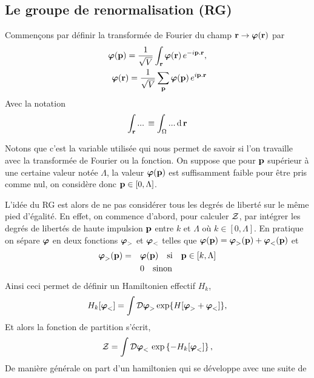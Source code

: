 \documentclass[10pt]{article}
\begin{document}
\begin{multicols}{2}
\vspace*{11pt}
\subsection{Le groupe de renormalisation (RG)}
Commençons par définir la transformée de Fourier du champ ${\bf r} \rightarrow \boldsymbol{ \varphi}({\bf r})$ par 
\begin{equation}
\begin{split}
\boldsymbol{ \varphi}({\bf p}) = \frac{1}{\sqrt{V}}\int_{\bf r} \boldsymbol{ \varphi}({\bf r}) \, e^{-i {\bf p} . {\bf r}}, \\
\boldsymbol{ \varphi}({\bf r}) = \frac{1}{\sqrt{V}}\sum_{\bf p} \boldsymbol{ \varphi}({\bf p}) \, e^{i {\bf p}  .{\bf r}}
\end{split} 	
\end{equation}
Avec la notation 
\begin{equation}
\int_{\bf r} ...\, \equiv \int_\Omega	... \, \text{d} \, {\bf r}
\end{equation}

Notons que c'est la variable utilisée qui nous permet de savoir si l'on travaille avec la transformée de Fourier ou la fonction. On suppose que pour ${\bf p}$ supérieur à une certaine valeur notée $\Lambda$, la valeur $\boldsymbol{ \varphi}({\bf p})$ est suffisamment faible pour être pris comme nul, on considère donc ${\bf p} \in [0, \Lambda]$. 

L'idée du RG est alors de ne pas considérer tous les degrés de liberté sur le même pied d'égalité. En effet, on commence d'abord, pour calculer $\mathcal{Z}$, par intégrer les degrés de libertés de haute impulsion ${\bf p}$ entre $k$ et $\Lambda$ où $k \in [0,\Lambda]$. En pratique on sépare $\boldsymbol{ \varphi}$ en deux fonctions $\boldsymbol{ \varphi}_>$ et $\boldsymbol{ \varphi}_<$ telles que $\boldsymbol{ \varphi}({\bf p}) = \boldsymbol{ \varphi}_>({\bf p}) + \boldsymbol{ \varphi}_<({\bf p})$ et
\begin{align}
	\boldsymbol{ \varphi}_>({\bf p})  = \quad & \boldsymbol{ \varphi}({\bf p}) \quad \text{si} \quad {\bf p} \in   [k,\Lambda] \\
	 & 0 \quad \text{sinon}
\end{align}
Ainsi ceci permet de définir un Hamiltonien effectif $H_k$, 
\begin{equation}
	H_k[\boldsymbol{ \varphi}_<] = \int \mathcal{D} \boldsymbol{ \varphi}_>  \exp \{ H[\boldsymbol{ \varphi}_>+ \boldsymbol{ \varphi}_<] \},
\end{equation}
Et alors la fonction de partition s'écrit, 
\begin{equation}
\mathcal{Z} = \int \mathcal{D} \boldsymbol{ \varphi}_< \, \exp\left\{- H_k[\boldsymbol{ \varphi}_<]\right\}, 
\end{equation} 
De manière générale on part d'un hamiltonien qui se développe avec une suite de 




\end{multicols}
\end{document}
